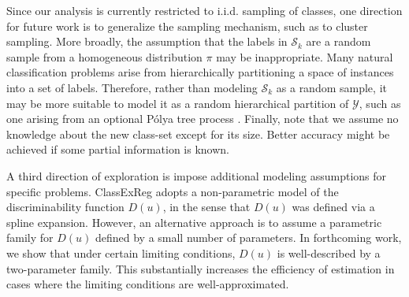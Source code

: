 \documentclass[twoside,11pt]{article}
\begin{document}
Since our analysis is currently restricted to i.i.d. sampling of classes, 
one direction for future work is to generalize the sampling mechanism,
such as to cluster sampling.  More broadly, the assumption that the labels in $\mathcal{S}_k$ are a
random sample from a homogeneous distribution $\pi$ may be inappropriate.  Many
natural classification problems arise from hierarchically partitioning
a space of instances into a set of labels.  Therefore, rather than
modeling $\mathcal{S}_k$ as a random sample, it may be more suitable
to model it as a random hierarchical partition of $\mathcal{Y}$, such as one arising from an optional P{\'o}lya tree process
\citep{wong2010optional}.
Finally, note that we assume no knowledge about the new class-set
except for its size. Better accuracy might be achieved if some partial information 
is known.




A third direction of exploration is impose additional modeling assumptions for specific problems.  ClassExReg adopts a non-parametric model of the discriminability function $D(u)$, in the sense that $D(u)$ was defined via a spline expansion.   However, an alternative approach is to assume a parametric family for $D(u)$ defined by a small number of parameters.  In forthcoming work, we show that under certain limiting conditions, $D(u)$ is well-described by a two-parameter family.  This substantially increases the efficiency of estimation in cases where the limiting conditions are well-approximated.






\end{document}

